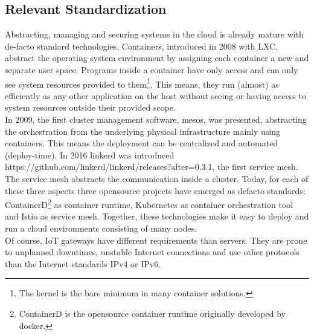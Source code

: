 \subsection{Relevant Standardization}
Abstracting, managing and securing systems in the cloud is already mature with de-facto standard technologies. Containers, introduced in 2008 with LXC, abstract the operating system environment by assigning each container a new and separate user space. Programs inside a container have only access and can only see system resources provided to them\footnote{The kernel is the bare minimum in many container solutions.}. This means, they run (almost) as efficiently as any other application on the host without seeing or having access to system resources outside their provided scope.\\
In 2009, the first cluster management software, mesos, was presented, abstracting the orchestration from the underlying physical infrastructure mainly using containers. This means the deployment can be centralized and automated (deploy-time). In 2016 linkerd was introduced https://github.com/linkerd/linkerd/releases?after=0.3.1, the first service mesh. The service mesh abstracts the communication inside a cluster. Today, for each of these three aspects three opensource projects have emerged as defacto standards: ContainerD\footnote{ContainerD is the opensource container runtime originally developed by docker.} as container runtime, Kubernetes as container orchestration tool and Istio as service mesh. Together, these technologies make it easy to deploy and run a cloud environments consisting of many nodes.\\
Of course, IoT gateways have different requirements than servers. They are prone to unplanned downtimes, unstable Internet connections and use other protocols than the Internet standards IPv4 or IPv6. 
